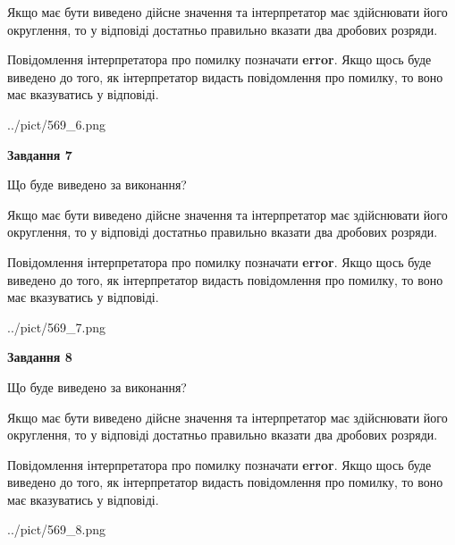 \documentclass[12pt, ukrainian]{article}
\begin{document}
{\begin {Large}
Якщо має бути виведено дійсне значення та інтерпретатор має здійснювати його округлення, 
то у відповіді достатньо правильно вказати два дробових розряди.

Повідомлення інтерпретатора про помилку позначати \textbf{error}.
Якщо щось буде виведено до того, як інтерпретатор видасть повідомлення про помилку, 
то воно має вказуватись у відповіді. \par

\begin{center}
	{../pict/569_6.png}
\end{center}
\newpage

{\begin {center}\textbf{Завдання 7}\end {center}}\par
Що буде виведено за виконання? \par

Якщо має бути виведено дійсне значення та інтерпретатор має здійснювати його округлення, 
то у відповіді достатньо правильно вказати два дробових розряди.

Повідомлення інтерпретатора про помилку позначати \textbf{error}.
Якщо щось буде виведено до того, як інтерпретатор видасть повідомлення про помилку, 
то воно має вказуватись у відповіді. \par

\begin{center}
	{../pict/569_7.png}
\end{center}
\newpage

{\begin {center}\textbf{Завдання 8}\end {center}}\par
Що буде виведено за виконання? \par

Якщо має бути виведено дійсне значення та інтерпретатор має здійснювати його округлення, 
то у відповіді достатньо правильно вказати два дробових розряди.

Повідомлення інтерпретатора про помилку позначати \textbf{error}.
Якщо щось буде виведено до того, як інтерпретатор видасть повідомлення про помилку, 
то воно має вказуватись у відповіді. \par

\begin{center}
	{../pict/569_8.png}
\end{center}
\newpage


\end{Large}}
\end{document}
